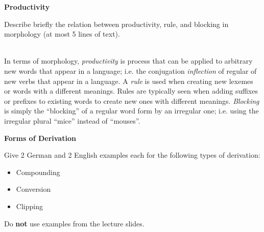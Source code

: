 \documentclass[11pt]{article}
\begin{document}
\vspace*{0.5cm}

\begin{problem}{4}
\textbf{Productivity}

Describe briefly the relation between productivity, rule, and blocking in morphology (at most
5 lines of text).

\end{problem}

\begin{solution} \\
In terms of morphology, \textit{productivity} is process that can be applied to arbitrary new words that appear in a language; i.e. the conjugation \textit{inflection} of regular of new verbs that appear in a language.  A \textit{rule} is used when creating new lexemes or words with a different meanings.  Rules are typically seen when adding suffixes or prefixes to existing words to create new ones with different meanings. \textit{Blocking} is simply the ``blocking'' of a regular word form by an irregular one; i.e. using the irregular plural ``mice'' instead of ``mouses''.
\end{solution}

\vspace*{0.5cm}

\begin{problem}{5}
\textbf{Forms of Derivation}

Give 2 German and 2 English examples each for the following types of derivation:
\begin{itemize}
	\item Compounding
	\item Conversion
	\item Clipping
\end{itemize}

Do \textbf{not} use examples from the lecture slides.

\end{problem}
\end{document}
